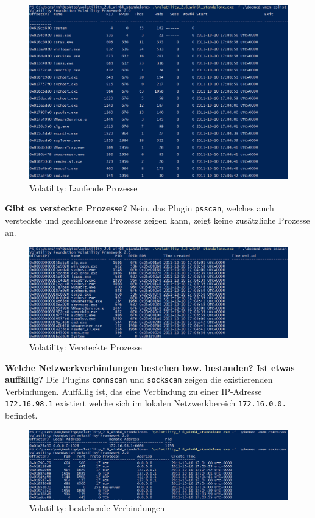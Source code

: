 \documentclass[
    a4paper,
    pagesize,
	pdftex,
    12pt,
]{scrartcl}
\begin{document}
\begin{figure}[H]
	\centering
	\includegraphics[width=18cm]{vol-prozesse.png}
	\caption{Volatility: Laufende Prozesse}
	\label{fig:vol-prozesse}
\end{figure} 
\textbf{Gibt es versteckte Prozesse?}
Nein, das Plugin \lstinline[breaklines]|psscan|, welches auch versteckte und geschlossene Prozesse zeigen kann, zeigt keine zusätzliche Prozesse an.
\begin{figure}[H]
	\centering
	\includegraphics[width=18cm]{vol-prozesse-verstekt.png}
	\caption{Volatility: Versteckte Prozesse}
	\label{fig:vol-prozesse-verstekt.png}
\end{figure} 
\textbf{Welche Netzwerkverbindungen bestehen bzw. bestanden? Ist etwas auffällig?}
Die Plugins \lstinline[breaklines]|connscan| und \lstinline[breaklines]|sockscan| zeigen die existierenden Verbindungen. Auffällig ist, das eine Verbindung zu einer IP-Adresse \lstinline[breaklines]|172.16.98.1| existiert welche sich im lokalen Netzwerkbereich \lstinline[breaklines]|172.16.0.0.| befindet.
\begin{figure}[H]
	\centering
	\includegraphics[width=18cm]{vol-verbindungen.png}
	\caption{Volatility: bestehende Verbindungen}
	\label{fig:vol-verbindungen.png}
\end{figure} 
\end{document}
